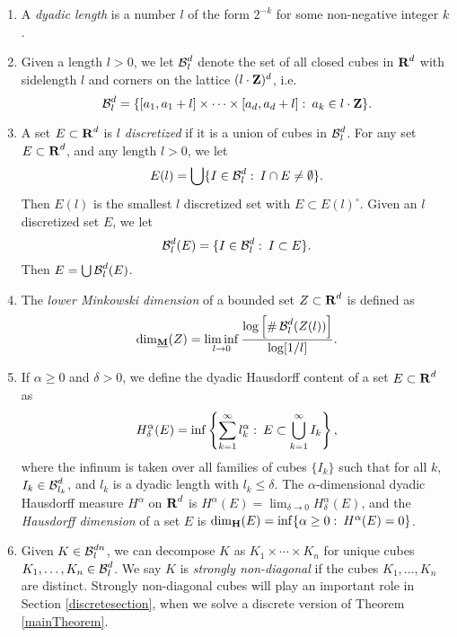 \begin{enumerate}
	\item\label{defDyadicLength} A {\it dyadic length} is a number $l$ of the form $2^{-k}$ for some non-negative integer $k$.

	\item\label{defDyadicGrid} Given a length $l > 0$, we let $\operatorname{\mathcal{B}}^d_l$ denote the set of all closed cubes in $\operatorname{\mathbf{R}}^d$ with sidelength $l$ and corners on the lattice $(l \cdot \operatorname{\mathbf{Z}})^d$, i.e.
	\[ \operatorname{\mathcal{B}}^d_l = \{ [a_1, a_1 + l] \times \cdots \times [a_d, a_d+l] \operatorname{\colon} a_k \in l \cdot \operatorname{\mathbf{Z}} \}. \]

	\item A set $E \subset \operatorname{\mathbf{R}}^d$ is \emph{$l$ discretized} if it is a union of cubes in $\operatorname{\mathcal{B}}^d_l$. For any set $E \subset \operatorname{\mathbf{R}}^d$, and any length $l > 0$, we let
	\[ E(l) = \bigcup \{ I \in \operatorname{\mathcal{B}}^d_l \operatorname{\colon} I \cap E \neq \emptyset \}. \]
	Then $E(l)$ is the smallest $l$ discretized set with $E \subset E(l)^\circ$. Given an $l$ discretized set $E$, we let
	\[ \operatorname{\mathcal{B}}^d_l(E) = \{ I \in \operatorname{\mathcal{B}}^d_l \operatorname{\colon} I \subset E \}. \]
	Then $E = \bigcup \operatorname{\mathcal{B}}^d_l(E)$.

	\item\label{defnMinkowskiDim} The {\it lower Minkowski dimension} of a bounded set $Z \subset \operatorname{\mathbf{R}}^d$ is defined as
	\[ \operatorname{\dim_{\underline{\mathbf{M}}}}(Z) = \liminf_{l \to 0} \frac{\log \left[ \# \operatorname{\mathcal{B}}^d_l(Z(l)) \right]}{\log[ 1/l ]}. \]

	\item\label{defHausdorffDim} If $\alpha \geq 0$ and $\delta > 0$, we define the dyadic Hausdorff content of a set $E\subset\operatorname{\mathbf{R}}^d$ as 
	\[ H^\alpha_\delta(E) = \inf \left\{ \sum_{k = 1}^\infty l_k^\alpha \operatorname{\colon} E \subset \bigcup_{k = 1}^\infty I_k \right\}, \]
	where the infinum is taken over all families of cubes $\{ I_k \}$ such that for all $k$, $I_k \in \operatorname{\mathcal{B}}^d_{l_k}$, and $l_k$ is a dyadic length with $l_k \leq \delta$. The $\alpha$-dimensional dyadic Hausdorff measure $H^\alpha$ on $\operatorname{\mathbf{R}}^d$ is $H^\alpha(E) = \lim_{\delta \to 0} H_\delta^\alpha(E)$, and the {\it Hausdorff dimension} of a set $E$ is $\operatorname{\dim_{\mathbf{H}}}(E) = \inf \{ \alpha \geq 0 \operatorname{\colon} H^\alpha(E) = 0 \}$.

	\item\label{defStronglyNonDiagonal} Given $K \in \operatorname{\mathcal{B}}^{dn}_l$, we can decompose $K$ as $K_1 \times \cdots \times K_n$ for unique cubes $K_1, \dots, K_n \in \operatorname{\mathcal{B}}_l^d$. We say $K$ is {\it strongly non-diagonal} if the cubes $K_1, \dots, K_n$ are distinct. Strongly non-diagonal cubes will play an important role in Section \ref{discretesection}, when we solve a discrete version of Theorem \ref{mainTheorem}.


\end{enumerate}
